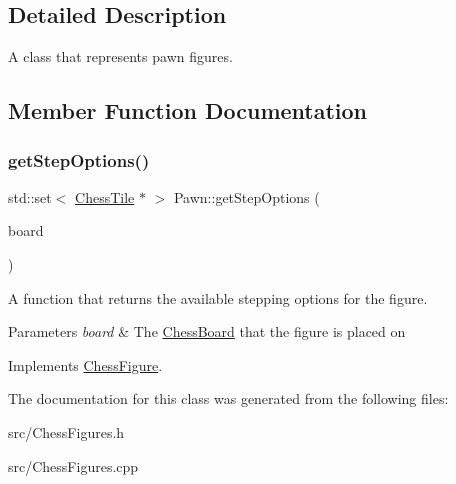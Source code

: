 \subsection{Detailed Description}
A class that represents pawn figures. 

\subsection{Member Function Documentation}
\mbox{\label{classPawn_aa05272b9dcf50914ca51c5be1fe2d014}} 
\subsubsection{\texorpdfstring{get\+Step\+Options()}{getStepOptions()}}
{\footnotesize\ttfamily std\+::set$<$ \mbox{\hyperlink{classChessTile}{Chess\+Tile}} $\ast$ $>$ Pawn\+::get\+Step\+Options (\begin{DoxyParamCaption}\item[{\mbox{\hyperlink{classChessBoard}{Chess\+Board}} \&}]{board }\end{DoxyParamCaption})\hspace{0.3cm}{\ttfamily [virtual]}}



A function that returns the available stepping options for the figure. 


\begin{DoxyParams}{Parameters}
{\em board} & The \mbox{\hyperlink{classChessBoard}{Chess\+Board}} that the figure is placed on \\
\hline
\end{DoxyParams}


Implements \mbox{\hyperlink{classChessFigure_ae78d52e35c4ea926f492d211c69758bd}{Chess\+Figure}}.



The documentation for this class was generated from the following files\+:\begin{DoxyCompactItemize}
\item 
src/Chess\+Figures.\+h\item 
src/Chess\+Figures.\+cpp\end{DoxyCompactItemize}
